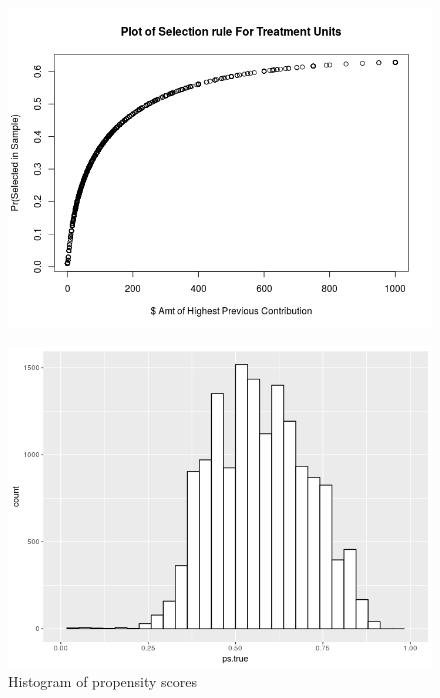 \documentclass{article}
\begin{document}
\begin{figure}
\caption{ }
\label{dt}
\center
\includegraphics[scale=1]{select_t.png}
\end{figure}

\begin{figure}
\center
\caption{Histogram of propensity scores}
\label{ps}
\includegraphics[scale=1]{pscores.png}
\end{figure}
\end{document}
